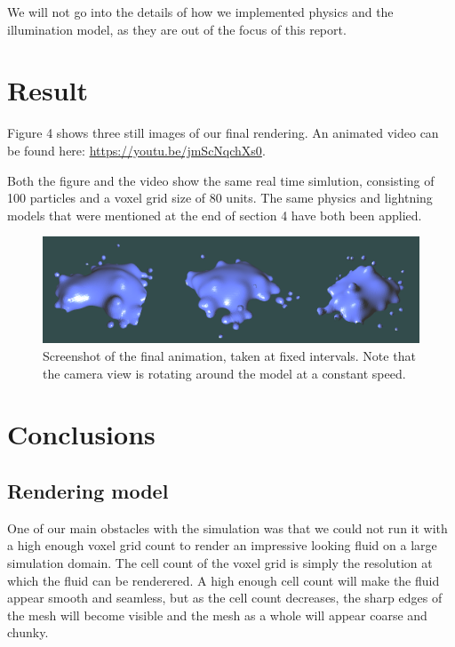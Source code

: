 \documentclass{article}
\begin{document}
\begin{multicols}{2}
            We will not go into the details of how we implemented physics and the illumination model, as they are out of the focus of this report.

    \section{Result}
        Figure 4 shows three still images of our final rendering. 
        An animated video can be found here:
        \url{https://youtu.be/jmScNqchXs0}.

        Both the figure and the video show the same real time simlution, consisting of 100 particles and a voxel grid size of 80 units.
        The same physics and lightning models that were mentioned at the end of section 4 have both been applied.

        \begin{figure}[H]
        	\begin{minipage}[b]{0.5\textwidth}
	            \includegraphics[width=\linewidth]{img/result-animation.png}
				\caption{Screenshot of the final animation, taken at fixed intervals. Note that the camera view is rotating around the model at a constant speed.}
				\label{fig:result-animation}
        	\end{minipage}
        \end{figure}

    \section{Conclusions}
    
        \subsection{Rendering model}
        
        One of our main obstacles with the simulation was that we could not run it with a high enough voxel grid count to render an impressive looking fluid on a large simulation domain.
        The cell count of the voxel grid is simply the resolution at which the fluid can be renderered.
        A high enough cell count will make the fluid appear smooth and seamless, but as the cell count decreases, the sharp edges of the mesh will become visible and the mesh as a whole will appear coarse and chunky.


\end{multicols}
\end{document}
